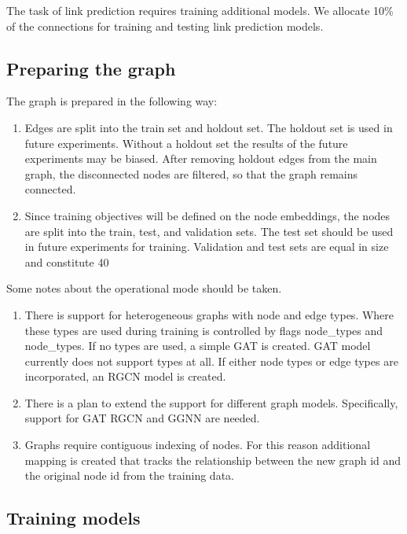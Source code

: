 \documentclass[a4paper,twoside]{article}
\begin{document}
The task of link prediction requires training additional models. We allocate 10\% of the connections for training and testing link prediction models.

\subsection{Preparing the graph}
The graph is prepared in the following way:
\begin{enumerate}
    \item Edges are split into the train set and holdout set. The holdout set is used in future experiments. Without a holdout set the results of the future experiments may be biased. After removing holdout edges from the main graph, the disconnected nodes are filtered, so that the graph remains connected.
    \item Since training objectives will be defined on the node embeddings, the nodes are split into the train, test, and validation sets. The test set should be used in future experiments for training. Validation and test sets are equal in size and constitute 40%
\end{enumerate}

Some notes about the operational mode should be taken. 
\begin{enumerate}
    \item There is support for heterogeneous graphs with node and edge types. Where these types are used during training is controlled by flags node\_types and node\_types. If no types are used, a simple GAT is created. GAT model currently does not support types at all. If either node types or edge types are incorporated, an RGCN model is created. 
    \item There is a plan to extend the support for different graph models. Specifically, support for  GAT RGCN and GGNN are needed. 
    \item Graphs require contiguous indexing of nodes. For this reason additional mapping is created that tracks the relationship between the new graph id and the original node id from the training data.
\end{enumerate}

\subsection{Training models}
\end{document}
